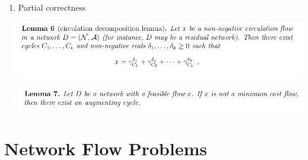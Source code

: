 \documentclass[11pt]{article}
\begin{document}
\begin{enumerate}
\item Partial correctness
\label{sec:org012f021}
\begin{center}
\includegraphics[width=.9\linewidth]{Network Flows/screenshot_2019-03-07_09-30-56.png}
\end{center}
\begin{center}
\includegraphics[width=.9\linewidth]{Network Flows/screenshot_2019-03-07_09-33-13.png}
\end{center}
\end{enumerate}

\section{Network Flow Problems}
\label{sec:org417d23f}
\end{document}
